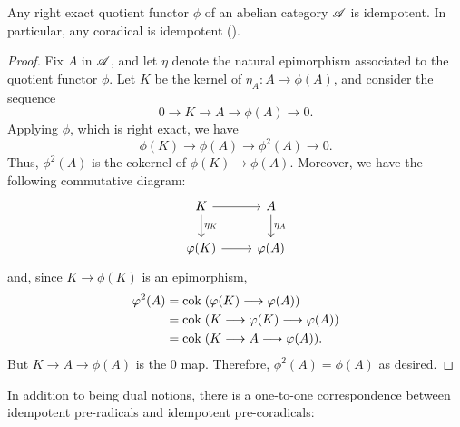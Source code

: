 \begin{prop}\label{prop_idempotence}
Any right exact quotient functor $\phi$ of an abelian category 
$\mathscr{A}$ is idempotent. In particular, any coradical is 
idempotent (\CF \cite[I2.2]{BJV}).
\end{prop}
\begin{proof}
Fix $A$ in $\mathscr{A}$, and let $\eta$ denote the natural epimorphism 
associated to the quotient functor $\phi$. Let $K$ be the kernel 
of $\eta_A: A \to \phi(A)$, and consider the sequence
\[
0 \to K \to A \to \phi(A) \to 0.
\]
Applying $\phi$, which is right exact, we have
\[
\phi(K) \to \phi(A) \to \phi^2(A) \to 0.
\]
Thus, $\phi^2(A)$ is the cokernel of $\phi(K) \to \phi(A)$. Moreover,
we have the following commutative diagram:
\[
\begin{tikzcd}
K \arrow{r} \arrow{d}{\eta_K} &
A \arrow{d}{\eta_A} \\
\phi(K) \arrow{r} &
\phi(A)
\end{tikzcd}
\]
and, since $K \to \phi(K)$ is an epimorphism,
\begin{align*}
\varphi^2(A) &= \mathrm{cok}\; (\varphi(K) \longrightarrow \varphi(A)) \\
          &= \mathrm{cok}\; (K \longrightarrow \varphi(K) \longrightarrow \varphi(A)) \\
          &= \mathrm{cok}\; (K \longrightarrow A \longrightarrow \varphi(A)).
\end{align*}
But $K \to A \to \phi(A)$ is the $0$ map. Therefore, $\phi^2(A) = 
\phi(A)$ as desired.
\end{proof}

In addition to being dual notions, there is a one-to-one 
correspondence between idempotent pre-radicals and
idempotent pre-coradicals:

